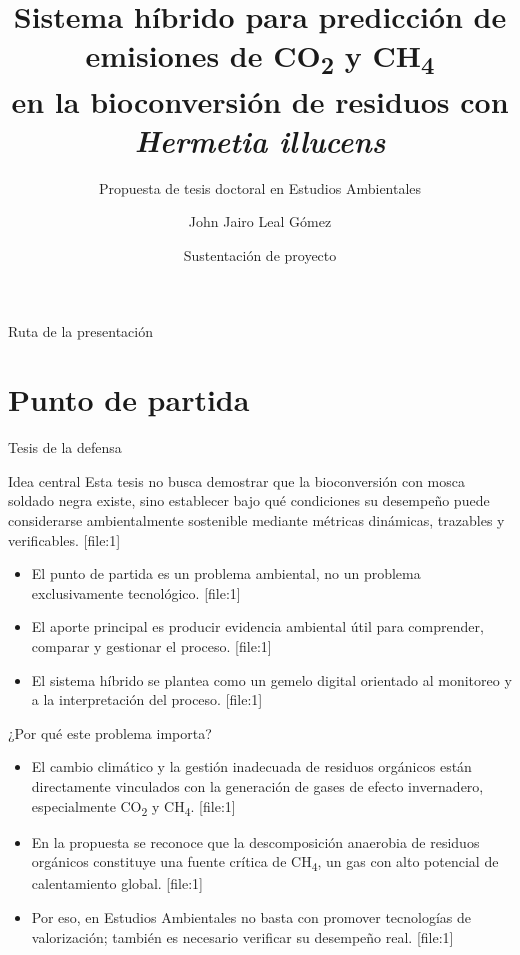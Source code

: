\documentclass[10pt,aspectratio=169]{beamer}
\title{Sistema híbrido para predicción de emisiones de CO\textsubscript{2} y CH\textsubscript{4}\\
en la bioconversión de residuos con \textit{Hermetia illucens}}
\subtitle{Propuesta de tesis doctoral en Estudios Ambientales}
\author{John Jairo Leal Gómez}
\institute{Doctorado en Estudios Ambientales\\
Universidad Nacional de Colombia -- Sede Palmira}
\date{Sustentación de proyecto}
\newcommand{\basecite}{\hfill{\color{griscita}\tiny [file:1]}}
\begin{document}
\begin{frame}
    \titlepage
\end{frame}

\begin{frame}{Ruta de la presentación}
\tableofcontents
\end{frame}

\section{Punto de partida}

\begin{frame}{Tesis de la defensa}
\justifying
\begin{block}{Idea central}
Esta tesis no busca demostrar que la bioconversión con mosca soldado negra existe, sino establecer bajo qué condiciones su desempeño puede considerarse ambientalmente sostenible mediante métricas dinámicas, trazables y verificables. \basecite
\end{block}

\pause
\begin{itemize}
    \item El punto de partida es un problema ambiental, no un problema exclusivamente tecnológico. \basecite
    \item El aporte principal es producir evidencia ambiental útil para comprender, comparar y gestionar el proceso. \basecite
    \item El sistema híbrido se plantea como un gemelo digital orientado al monitoreo y a la interpretación del proceso. \basecite
\end{itemize}
\end{frame}

\begin{frame}{¿Por qué este problema importa?}
\justifying
\begin{itemize}
    \item El cambio climático y la gestión inadecuada de residuos orgánicos están directamente vinculados con la generación de gases de efecto invernadero, especialmente CO\textsubscript{2} y CH\textsubscript{4}. \basecite
    \item En la propuesta se reconoce que la descomposición anaerobia de residuos orgánicos constituye una fuente crítica de CH\textsubscript{4}, un gas con alto potencial de calentamiento global. \basecite
    \item Por eso, en Estudios Ambientales no basta con promover tecnologías de valorización; también es necesario verificar su desempeño real. \basecite
\end{itemize}
\end{frame}
\end{document}
